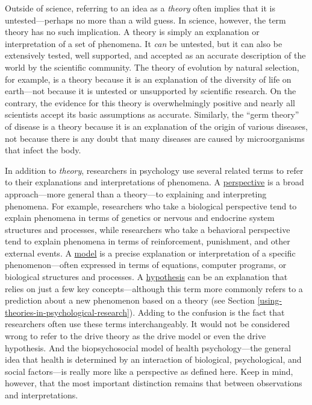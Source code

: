 \documentclass[
]{krantz}
\begin{document}
Outside of science, referring to an idea as a \emph{theory} often implies that it is untested---perhaps no more than a wild guess. In science, however, the term theory has no such implication. A theory is simply an explanation or interpretation of a set of phenomena. It \emph{can} be untested, but it can also be extensively tested, well supported, and accepted as an accurate description of the world by the scientific community. The theory of evolution by natural selection, for example, is a theory because it is an explanation of the diversity of life on earth---not because it is untested or unsupported by scientific research. On the contrary, the evidence for this theory is overwhelmingly positive and nearly all scientists accept its basic assumptions as accurate. Similarly, the ``germ theory'' of disease is a theory because it is an explanation of the origin of various diseases, not because there is any doubt that many diseases are caused by microorganisms that infect the body.

In addition to \emph{theory}, researchers in psychology use several related terms to refer to their explanations and interpretations of phenomena. A \protect\hyperlink{perspective}{perspective} is a broad approach---more general than a theory---to explaining and interpreting phenomena. For example, researchers who take a biological perspective tend to explain phenomena in terms of genetics or nervous and endocrine system structures and processes, while researchers who take a behavioral perspective tend to explain phenomena in terms of reinforcement, punishment, and other external events. A \protect\hyperlink{model}{model} is a precise explanation or interpretation of a specific phenomenon---often expressed in terms of equations, computer programs, or biological structures and processes. A \protect\hyperlink{hypothesis}{hypothesis} can be an explanation that relies on just a few key concepts---although this term more commonly refers to a prediction about a new phenomenon based on a theory (see Section \ref{using-theories-in-psychological-research}). Adding to the confusion is the fact that researchers often use these terms interchangeably. It would not be considered wrong to refer to the drive theory as the drive model or even the drive hypothesis. And the biopsychosocial model of health psychology---the general idea that health is determined by an interaction of biological, psychological, and social factors---is really more like a perspective as defined here. Keep in mind, however, that the most important distinction remains that between observations and interpretations.
\end{document}
